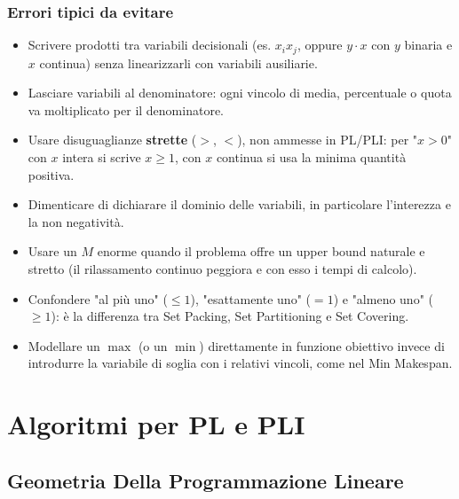 \documentclass[12pt]{extarticle} %
\begin{document}
\subsubsection{Errori tipici da evitare}
\begin{itemize}
    \item Scrivere prodotti tra variabili decisionali (es. $x_i x_j$, oppure $y\cdot x$ con $y$ binaria e $x$ continua) senza linearizzarli con variabili ausiliarie.
    \item Lasciare variabili al denominatore: ogni vincolo di media, percentuale o quota va moltiplicato per il denominatore.
    \item Usare disuguaglianze \textbf{strette} ($>$, $<$), non ammesse in PL/PLI: per "$x>0$" con $x$ intera si scrive $x \ge 1$, con $x$ continua si usa la minima quantità positiva.
    \item Dimenticare di dichiarare il dominio delle variabili, in particolare l'interezza e la non negatività.
    \item Usare un $M$ enorme quando il problema offre un upper bound naturale e stretto (il rilassamento continuo peggiora e con esso i tempi di calcolo).
    \item Confondere "al più uno" ($\le 1$), "esattamente uno" ($=1$) e "almeno uno" ($\ge 1$): è la differenza tra Set Packing, Set Partitioning e Set Covering.
    \item Modellare un $\max$ (o un $\min$) direttamente in funzione obiettivo invece di introdurre la variabile di soglia con i relativi vincoli, come nel Min Makespan.
\end{itemize}

\newpage

\section{Algoritmi per PL e PLI}

\subsection{Geometria Della Programmazione Lineare}
\end{document}
